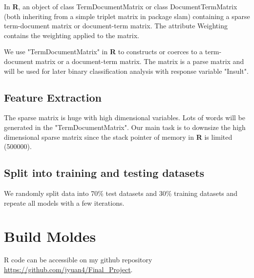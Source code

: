 \documentclass[11pt]{article}
\begin{document}
\begin{singlespacing}
In \textbf{R}, an object of class TermDocumentMatrix or class DocumentTermMatrix (both inheriting from a simple triplet matrix in package slam) containing a sparse term-document matrix or document-term matrix. The attribute Weighting contains the weighting applied to the matrix.

We use "TermDocumentMatrix" in \textbf{R} to constructs or coerces to a term-document matrix or a document-term matrix. The matrix is a parse matrix and will be used for later binary classification analysis with response variable "Insult".

\subsection{Feature Extraction}
The sparse matrix is huge with high dimensional variables. Lots of words will be generated in the "TermDocumentMatrix". Our main task is to downsize the high dimensional sparse matrix since the stack pointer of memory in \textbf{R} is limited (500000).

\subsection{Split into training and testing datasets}
We randomly split data into 70\% test datasets and 30\% training datasets and repeate all models with a few iterations.


\section{Build Moldes}
R code can be accessible on my github repository \url{https://github.com/jyuan4/Final_Project}.

\end{singlespacing}
\end{document}
